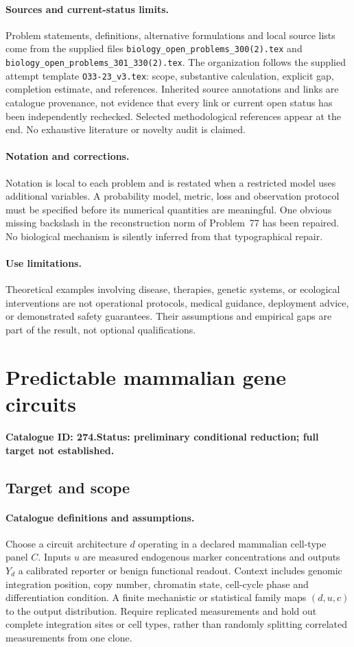 \documentclass[11pt]{article}
\begin{document}
\paragraph{Sources and current-status limits.}
Problem statements, definitions, alternative formulations and local source lists
come from the supplied files
\texttt{biology\_open\_problems\_300(2).tex} and
\texttt{biology\_open\_problems\_301\_330(2).tex}.
The organization follows the supplied attempt template
\texttt{O33-23\_v3.tex}: scope, substantive calculation, explicit gap,
completion estimate, and references. Inherited source annotations and links are
catalogue provenance, not evidence that every link or current open status has
been independently rechecked. Selected methodological references appear at the
end. No exhaustive literature or novelty audit is claimed.

\paragraph{Notation and corrections.}
Notation is local to each problem and is restated when a restricted model uses
additional variables. A probability model, metric, loss and observation protocol
must be specified before its numerical quantities are meaningful. One obvious
missing backslash in the reconstruction norm of Problem~77 has been repaired.
No biological mechanism is silently inferred from that typographical repair.

\paragraph{Use limitations.}
Theoretical examples involving disease, therapies, genetic systems, or ecological
interventions are not operational protocols, medical guidance, deployment advice,
or demonstrated safety guarantees. Their assumptions and empirical gaps are part
of the result, not optional qualifications.

\setcounter{section}{273}
\section{Predictable mammalian gene circuits}
\label{prob:274}
\noindent\textbf{Catalogue ID: 274.}\quad \textbf{Status: preliminary conditional reduction; full target not established.}
\subsection{Target and scope}
\paragraph{Catalogue definitions and assumptions.}
Choose a circuit architecture $d$ operating in a declared mammalian cell-type panel $C$. Inputs $u$ are measured endogenous marker concentrations and outputs $Y_d$ a calibrated reporter or benign functional readout. Context includes genomic integration position, copy number, chromatin state, cell-cycle phase and differentiation condition. A finite mechanistic or statistical family maps $(d,u,c)$ to the output distribution. Require replicated measurements and hold out complete integration sites or cell types, rather than randomly splitting correlated measurements from one clone.
\end{document}
